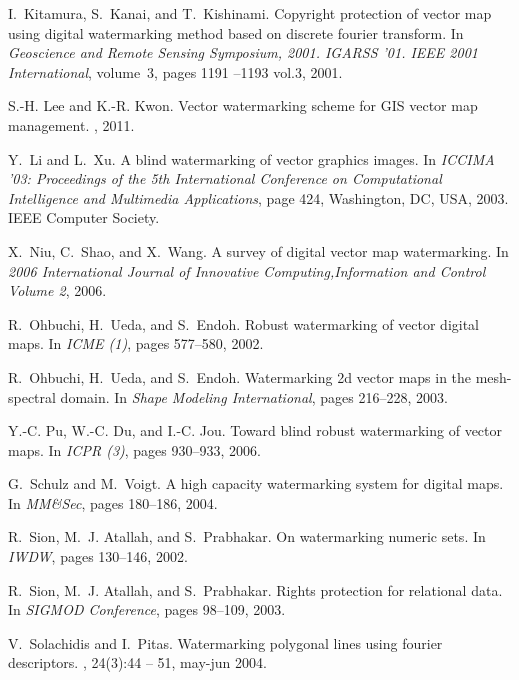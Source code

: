 \documentclass{sig-alternate}%
\begin{document}
\begin{thebibliography}{10}
I.~Kitamura, S.~Kanai, and T.~Kishinami.
\newblock Copyright protection of vector map using digital watermarking method
  based on discrete fourier transform.
\newblock In {\em Geoscience and Remote Sensing Symposium, 2001. IGARSS '01.
  IEEE 2001 International}, volume~3, pages 1191 --1193 vol.3, 2001.

S.-H. Lee and K.-R. Kwon.
\newblock Vector watermarking scheme for {GIS} vector map management.
, 2011.

Y.~Li and L.~Xu.
\newblock A blind watermarking of vector graphics images.
\newblock In {\em ICCIMA '03: Proceedings of the 5th International Conference
  on Computational Intelligence and Multimedia Applications}, page 424,
  Washington, DC, USA, 2003. IEEE Computer Society.

X.~Niu, C.~Shao, and X.~Wang.
\newblock A survey of digital vector map watermarking.
\newblock In {\em 2006 International Journal of Innovative
  Computing,Information and Control Volume 2}, 2006.

R.~Ohbuchi, H.~Ueda, and S.~Endoh.
\newblock Robust watermarking of vector digital maps.
\newblock In {\em ICME (1)}, pages 577--580, 2002.

R.~Ohbuchi, H.~Ueda, and S.~Endoh.
\newblock Watermarking 2d vector maps in the mesh-spectral domain.
\newblock In {\em Shape Modeling International}, pages 216--228, 2003.

Y.-C. Pu, W.-C. Du, and I.-C. Jou.
\newblock Toward blind robust watermarking of vector maps.
\newblock In {\em ICPR (3)}, pages 930--933, 2006.

G.~Schulz and M.~Voigt.
\newblock A high capacity watermarking system for digital maps.
\newblock In {\em MM{\&}Sec}, pages 180--186, 2004.

R.~Sion, M.~J. Atallah, and S.~Prabhakar.
\newblock On watermarking numeric sets.
\newblock In {\em IWDW}, pages 130--146, 2002.

R.~Sion, M.~J. Atallah, and S.~Prabhakar.
\newblock Rights protection for relational data.
\newblock In {\em SIGMOD Conference}, pages 98--109, 2003.

V.~Solachidis and I.~Pitas.
\newblock Watermarking polygonal lines using fourier descriptors.
, 24(3):44 -- 51,
  may-jun 2004.


\end{thebibliography}
\end{document}
